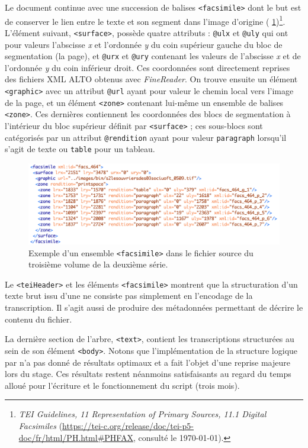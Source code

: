 Le document continue avec une succession de balises \texttt{<facsimile>} dont le but est de conserver le lien entre le texte et son segment dans l'image d'origine (\fig{} \ref{fig:facsimile})\footnote{\textit{TEI Guidelines, 11 Representation of Primary Sources, 11.1 Digital Facsimiles} (\url{https://tei-c.org/release/doc/tei-p5-doc/fr/html/PH.html\#PHFAX}, consulté le \today).}. L'élément suivant, \texttt{<surface>}, possède quatre attributs : \texttt{@ulx} et \texttt{@uly} qui ont pour valeurs l'abscisse \textit{x} et l'ordonnée \textit{y} du coin supérieur gauche du bloc de segmentation (la page), et \texttt{@urx} et \texttt{@ury} contenant les valeurs de l'abscisse \textit{x} et de l'ordonnée \textit{y} du coin inférieur droit. Ces coordonnées sont directement reprises des fichiers XML ALTO obtenus avec \textit{FineReader}. On trouve ensuite un élément \texttt{<graphic>} avec un attribut \texttt{@url} ayant pour valeur le chemin local vers l'image de la page, et un élément \texttt{<zone>} contenant lui-même un ensemble de balises \texttt{<zone>}. Ces dernières contiennent les coordonnées des blocs de segmentation à l'intérieur du bloc supérieur définit par \texttt{<surface>} ; ces sous-blocs sont catégorisés par un attribut \texttt{@rendition} ayant pour valeur \texttt{paragraph} lorsqu'il s'agit de texte ou \texttt{table} pour un tableau.

\begin{figure}
    \centering
    \includegraphics[width=16cm]{img/facsimile.png}
    \caption[Exemple d'un ensemble \texttt{<facsimile>}]{Exemple d'un ensemble \texttt{<facsimile>} dans le fichier source du troisième volume de la deuxième série.}
    \label{fig:facsimile}
\end{figure}

Le \texttt{<teiHeader>} et les éléments \texttt{<facsimile>} montrent que la structuration d'un texte brut issu d'une \ocr{} ne consiste pas simplement en l'encodage de la transcription. Il s'agit aussi de produire des métadonnées permettant de décrire le contenu du fichier.

La dernière section de l'arbre, \texttt{<text>}, contient les transcriptions structurées au sein de son élément \texttt{<body>}. Notons que l'implémentation de la structure logique par \lse{} n'a pas donné de résultats optimaux et a fait l'objet d'une reprise majeure lors du stage. Ces résultats restent néanmoins satisfaisants au regard du temps alloué pour l'écriture et le fonctionnement du  script (trois mois). 


